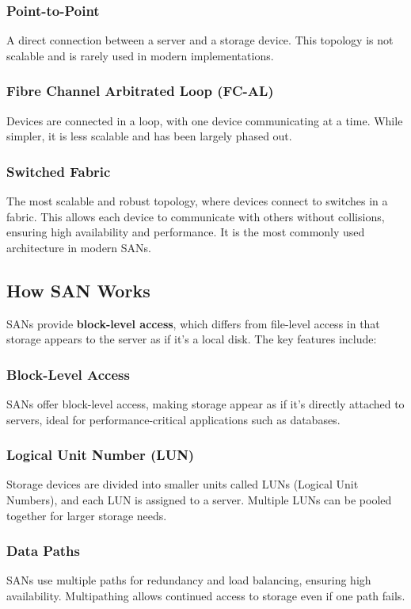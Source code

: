 \documentclass{article}
\begin{document}
\subsubsection{Point-to-Point}
A direct connection between a server and a storage device. This topology is not scalable and is rarely used in modern implementations.

\subsubsection{Fibre Channel Arbitrated Loop (FC-AL)}
Devices are connected in a loop, with one device communicating at a time. While simpler, it is less scalable and has been largely phased out.

\subsubsection{Switched Fabric}
The most scalable and robust topology, where devices connect to switches in a fabric. This allows each device to communicate with others without collisions, ensuring high availability and performance. It is the most commonly used architecture in modern SANs.

\subsection{How SAN Works}
SANs provide \textbf{block-level access}, which differs from file-level access in that storage appears to the server as if it's a local disk. The key features include:

\subsubsection{Block-Level Access}
SANs offer block-level access, making storage appear as if it's directly attached to servers, ideal for performance-critical applications such as databases.

\subsubsection{Logical Unit Number (LUN)}
Storage devices are divided into smaller units called LUNs (Logical Unit Numbers), and each LUN is assigned to a server. Multiple LUNs can be pooled together for larger storage needs.

\subsubsection{Data Paths}
SANs use multiple paths for redundancy and load balancing, ensuring high availability. Multipathing allows continued access to storage even if one path fails.
\end{document}
